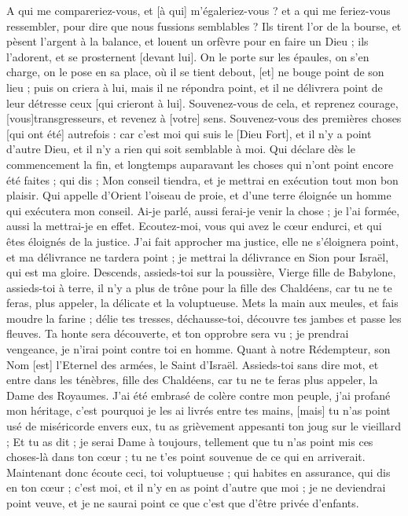 \begin{multicols}{2}
A qui me compareriez-vous, et [à qui] m'égaleriez-vous ? et a qui me feriez-vous ressembler, pour dire que nous fussions semblables ?
Ils tirent l'or de la bourse, et pèsent l'argent à la balance, et louent un orfèvre pour en faire un Dieu ; ils l'adorent, et se prosternent [devant lui].
On le porte sur les épaules, on s'en charge, on le pose en sa place, où il se tient debout, [et] ne bouge point de son lieu ; puis on criera à lui, mais il ne répondra point, et il ne délivrera point de leur détresse ceux [qui crieront à lui].
Souvenez-vous de cela, et reprenez courage, [vous]transgresseurs, et revenez à [votre] sens.
Souvenez-vous des premières choses [qui ont été] autrefois : car c'est moi qui suis le [Dieu Fort], et il n'y a point d'autre Dieu, et il n'y a rien qui soit semblable à moi.
Qui déclare dès le commencement la fin, et longtemps auparavant les choses qui n'ont point encore été faites ; qui dis ; Mon conseil tiendra, et je mettrai en exécution tout mon bon plaisir.
Qui appelle d'Orient l'oiseau de proie, et d'une terre éloignée un homme qui exécutera mon conseil. Ai-je parlé, aussi ferai-je venir la chose ; je l'ai formée, aussi la mettrai-je en effet.
Ecoutez-moi, vous qui avez le cœur endurci, et qui êtes éloignés de la justice.
J'ai fait approcher ma justice, elle ne s'éloignera point, et ma délivrance ne tardera point ; je mettrai la délivrance en Sion pour Israël, qui est ma gloire.
\VerseOne{}Descends, assieds-toi sur la poussière, Vierge fille de Babylone, assieds-toi à terre, il n'y a plus de trône pour la fille des Chaldéens, car tu ne te feras, plus appeler, la délicate et la voluptueuse.
Mets la main aux meules, et fais moudre la farine ; délie tes tresses, déchausse-toi, découvre tes jambes et passe les fleuves.
Ta honte sera découverte, et ton opprobre sera vu ; je prendrai vengeance, je n'irai point contre toi en homme.
Quant à notre Rédempteur, son Nom [est] l'Eternel des armées, le Saint d'Israël.
Assieds-toi sans dire mot, et entre dans les ténèbres, fille des Chaldéens, car tu ne te feras plus appeler, la Dame des Royaumes.
J'ai été embrasé de colère contre mon peuple, j'ai profané mon héritage, c'est pourquoi je les ai livrés entre tes mains, [mais] tu n'as point usé de miséricorde envers eux, tu as grièvement appesanti ton joug sur le vieillard ;
Et tu as dit ; je serai Dame à toujours, tellement que tu n'as point mis ces choses-là dans ton cœur ; tu ne t'es point souvenue de ce qui en arriverait.
Maintenant donc écoute ceci, toi voluptueuse ; qui habites en assurance, qui dis en ton cœur ; c'est moi, et il n'y en as point d'autre que moi ; je ne deviendrai point veuve, et je ne saurai point ce que c'est que d'être privée d'enfants.

\end{multicols}
